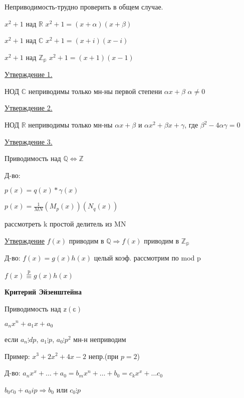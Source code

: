 \documentclass{article}
\begin{document}
Неприводимость-трудно проверить в общем случае.

$x^2+1$ над $\mathds{R}$ $x^2+1=(x+\alpha)(x+\beta)$

$x^2+1$ над $\mathds{C}$ $x^2+1=(x+i)(x-i)$

$x^2+1$ над $\mathds{Z_p}$ $x^2+1=(x+1)(x-1)$

\underline{Утверждение 1.}

НОД $\mathds{C}$ неприводимы только мн-ны первой степени $\alpha x+\beta$ $\alpha\neq 0$

\underline{Утверждение 2.}

НОД $\mathds{R}$ неприводимы только мн-ны $\alpha x+\beta$ и $\alpha x^2+\beta x+\gamma$, где $\beta^2-4\alpha\gamma=0$

\underline{Утверждение 3.}

Приводимость над $\mathds{Q}\Leftrightarrow \mathds{Z}$

Д-во:

$p(x)=q(x)*\gamma(x)$

$p(x)=\frac{1}{MN}(M_p(x))(N_q(x))$

рассмотреть k простой делитель из MN 

\underline{Утверждение} $f(x)$ приводим в $ \mathds{Q}\Rightarrow f(x)$ приводим в $\mathds{Z_p}$

Д-во: $f(x)=g(x)h(x)$ целый коэф. рассмотрим по mod p 

$f(x)\stackrel{\mathrm{p}}{\equiv}g(x)h(x)$

\textbf{Критерий Эйзенштейна}

Приводимость над $\mathds{z(\mathds{c})}$

$a_{n}x^n+a_{1}x+a_0$

если $a_n\vdots d p$, $a_1\vdots p$, $a_0\vdots p^2$ мн-н неприводим

Пример: $x^3+2x^2+4x-2$ непр.(при $p=2$)

Д-во: $a_{n}x^x+\dots+a_0=b_{m}x^n+\dots+b_0=c_{k}x^x+\dots c_0$

$b_{0}c_{0}+a_{0}ip\Rightarrow b_0$ или $c_0\vdots p$
\end{document}
